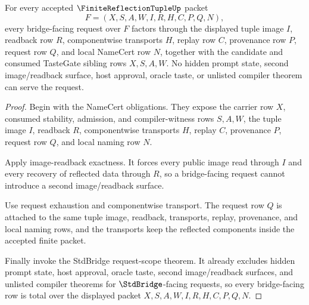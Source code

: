 \begin{theorem}
\label{thm:finite-reflection-tuple-bridge-facing-row-totality}
For every accepted $\FiniteReflectionTupleUp$ packet
$$
F=(X,S,A,W,I,R,H,C,P,Q,N),
$$
every bridge-facing request over $F$ factors through the displayed tuple image $I$, readback row $R$, componentwise transports $H$, replay row $C$, provenance row $P$, request row $Q$, and local NameCert row $N$, together with the candidate and consumed TasteGate sibling rows $X,S,A,W$. No hidden prompt state, second image/readback surface, host approval, oracle taste, or unlisted compiler theorem can serve the request.
\end{theorem}
\begin{proof}
Begin with the NameCert obligations. They expose the carrier row $X$, consumed stability, admission, and compiler-witness rows $S,A,W$, the tuple image $I$, readback $R$, componentwise transports $H$, replay $C$, provenance $P$, request row $Q$, and local naming row $N$.

Apply image-readback exactness. It forces every public image read through $I$ and every recovery of reflected data through $R$, so a bridge-facing request cannot introduce a second image/readback surface.

Use request exhaustion and componentwise transport. The request row $Q$ is attached to the same tuple image, readback, transports, replay, provenance, and local naming rows, and the transports keep the reflected components inside the accepted finite packet.

Finally invoke the StdBridge request-scope theorem. It already excludes hidden prompt state, host approval, oracle taste, second image/readback surfaces, and unlisted compiler theorems for $\StdBridge$-facing requests, so every bridge-facing row is total over the displayed packet $X,S,A,W,I,R,H,C,P,Q,N$.
\end{proof}

